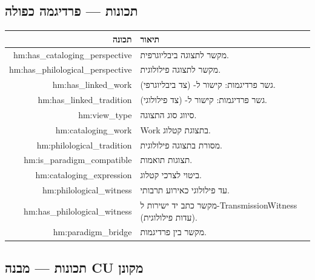 \documentclass[12pt,a4paper]{article}
\newcommand{\en}[1]{\textenglish{\LR{#1}}}
\newcommand{\new}[1]{\textcolor{newaddition}{#1}}
\newcommand{\newprop}[1]{\textcolor{newaddition}{#1}}
\begin{document}
\subsection{\new{תכונות   — פרדיגמה כפולה}}

\begin{longtable}{|r|p{8cm}|}
\hline
\textbf{תכונה} & \textbf{תיאור} \\
\hline
\endhead

\newprop{hm:has\_cataloging\_perspective} & \new{מקשר לתצוגה ביבליוגרפית.}\\
\hline
\newprop{hm:has\_philological\_perspective} & \new{מקשר לתצוגה פילולוגית.}\\
\hline
\newprop{hm:has\_linked\_work} & \new{גשר פרדיגמות: קישור ל-\en{Work} (צד ביבליוגרפי).}\\
\hline
\newprop{hm:has\_linked\_tradition} & \new{גשר פרדיגמות: קישור ל-\en{TextTradition} (צד פילולוגי).}\\
\hline
\newprop{hm:view\_type} & \new{סיווג סוג התצוגה.}\\
\hline
\newprop{hm:cataloging\_work} & \new{Work בתצוגת קטלוג.}\\
\hline
\newprop{hm:philological\_tradition} & \new{מסורת בתצוגה פילולוגית.}\\
\hline
\newprop{hm:is\_paradigm\_compatible} & \new{תצוגות תואמות.}\\
\hline

\newprop{hm:cataloging\_expression} & \new{ביטוי לצרכי קטלוג.}\\
\hline

\newprop{hm:philological\_witness} & \new{עד פילולוגי כאירוע תרבותי.}\\
\hline

\newprop{hm:has\_philological\_witness} & \new{מקשר כתב יד ישירות ל-\textenglish{TransmissionWitness} (עדות פילולוגית).}\\
\hline

\newprop{hm:paradigm\_bridge} & \new{מקשר בין פרדיגמות.}\\
\hline
\end{longtable}

\subsection{\new{תכונות   — מבנה CU מקונן}}
\end{document}

